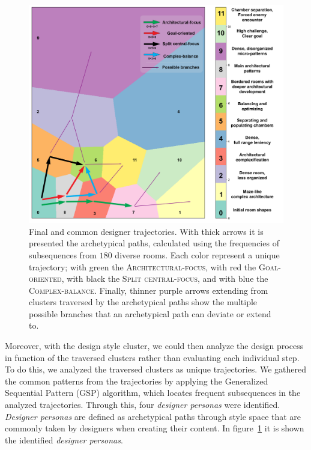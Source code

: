 \begin{figure}[t!]
\centerline{\includegraphics[width=\textwidth]{figures/DesPersonas-figs/resulting-paths-FINAL.png}}
\caption{Final and common designer trajectories. With thick arrows it is presented the archetypical paths, calculated using the frequencies of subsequences from $180$ diverse rooms. Each color represent a unique trajectory; with green the \textsc{Architectural-focus}, with red the \textsc{Goal-oriented}, with black the \textsc{Split central-focus}, and with blue the \textsc{Complex-balance}. Finally, thinner purple arrows extending from clusters traversed by the archetypical paths show the multiple possible branches that an archetypical path can deviate or extend to.} \label{fig:desPersonas}
\end{figure}

Moreover, with the design style cluster, we could then analyze the design process in function of the traversed clusters rather than evaluating each individual step. To do this, we analyzed the traversed clusters as unique trajectories. We gathered the common patterns from the trajectories by applying the Generalized Sequential Pattern (GSP) algorithm, which locates frequent subsequences in the analyzed trajectories. Through this, four \textit{designer personas} were identified. \textit{Designer personas} are defined as archetypical paths through style space that are commonly taken by designers when creating their content. In figure~\ref{fig:desPersonas} it is shown the identified \textit{designer personas}.

